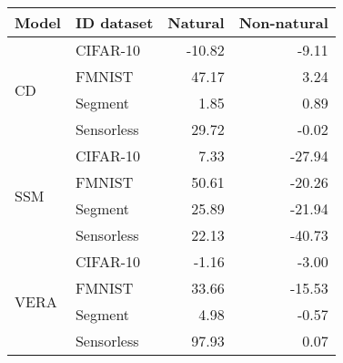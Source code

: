 \begin{tabular}{llrr}
\toprule
 Model    &ID dataset &  Natural &  Non-natural \\
\midrule
\multirow{4}{*}{CD} & CIFAR-10 &   -10.82 &      -9.11 \\
     & FMNIST &    47.17 &       3.24 \\
     & Segment &     1.85 &       0.89 \\
     & Sensorless &    29.72 &      -0.02 \\
\midrule
\multirow{4}{*}{SSM} & CIFAR-10 &     7.33 &     -27.94 \\
     & FMNIST &    50.61 &     -20.26 \\
     & Segment &    25.89 &     -21.94 \\
     & Sensorless &    22.13 &     -40.73 \\
\midrule
\multirow{4}{*}{VERA} & CIFAR-10 &    -1.16 &      -3.00 \\
     & FMNIST &    33.66 &     -15.53 \\
     & Segment &     4.98 &      -0.57 \\
     & Sensorless &    97.93 &       0.07 \\
\bottomrule
\end{tabular}
